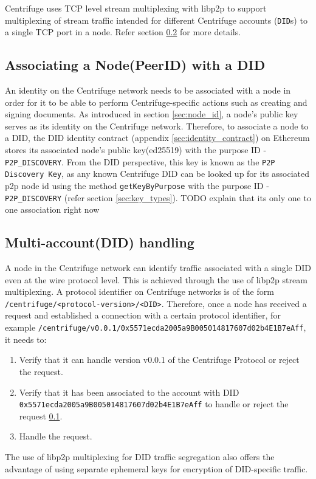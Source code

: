 Centrifuge uses TCP level stream multiplexing with libp2p to support multiplexing of stream traffic intended for different Centrifuge accounts (\texttt{DID}s) to a single TCP port in a node. Refer section \ref{multi account} for more details.

\subsection{Associating a Node(PeerID) with a DID}\label{did-node}

An identity on the Centrifuge network needs to be associated with a node in order for it to be able to perform Centrifuge-specific actions such as creating and signing documents. As introduced in section \ref{sec:node_id}, a node's public key serves as its identity on the Centrifuge network. Therefore, to associate a node to a DID, the DID identity contract (appendix \ref{sec:identity_contract}) on Ethereum stores its associated node's public key(ed25519) with the purpose ID - \texttt{P2P\_DISCOVERY}. From the DID perspective, this key is known as the \texttt{P2P Discovery Key}, as any known Centrifuge DID can be looked up for its associated p2p node id using the method \texttt{getKeyByPurpose} with the purpose ID - \texttt{P2P\_DISCOVERY} (refer section \ref{sec:key_types}). TODO explain that its only one to one association right now


\subsection{Multi-account(DID) handling} \label{multi account}

A node in the Centrifuge network can identify traffic associated with a single DID even at the wire protocol level. This is achieved through the use of libp2p stream multiplexing. A protocol identifier on Centrifuge networks is of the form \texttt{/centrifuge/<protocol-version>/<DID>}. Therefore, once a node has received a request and established a connection with a certain protocol identifier, for example \texttt{/centrifuge/v0.0.1/0x5571ecda2005a9B005014817607d02b4E1B7eAff}, it needs to:
\begin{enumerate}
  \item Verify that it can handle version v0.0.1 of the Centrifuge Protocol or reject the request.
  \item Verify that it has been associated to the account with DID \texttt{0x5571ecda2005a9B005014817607d02b4E1B7eAff} to handle or reject the request \ref{did-node}.
  \item Handle the request.
\end{enumerate}
The use of libp2p multiplexing for DID traffic segregation also offers the advantage of using separate ephemeral keys for encryption of DID-specific traffic.

